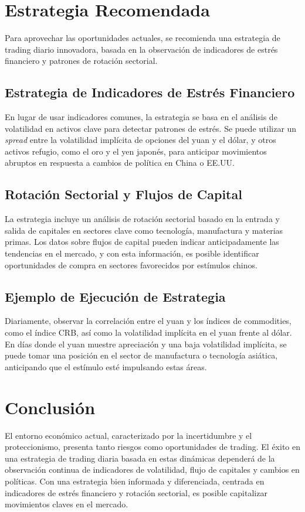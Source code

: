 \documentclass{article}
\begin{document}
\section{Estrategia Recomendada}
Para aprovechar las oportunidades actuales, se recomienda una estrategia de trading diario innovadora, basada en la observación de indicadores de estrés financiero y patrones de rotación sectorial.

\subsection{Estrategia de Indicadores de Estrés Financiero}
En lugar de usar indicadores comunes, la estrategia se basa en el análisis de volatilidad en activos clave para detectar patrones de estrés. Se puede utilizar un \textit{spread} entre la volatilidad implícita de opciones del yuan y el dólar, y otros activos refugio, como el oro y el yen japonés, para anticipar movimientos abruptos en respuesta a cambios de política en China o EE.UU.

\subsection{Rotación Sectorial y Flujos de Capital}
La estrategia incluye un análisis de rotación sectorial basado en la entrada y salida de capitales en sectores clave como tecnología, manufactura y materias primas. Los datos sobre flujos de capital pueden indicar anticipadamente las tendencias en el mercado, y con esta información, es posible identificar oportunidades de compra en sectores favorecidos por estímulos chinos.

\subsection{Ejemplo de Ejecución de Estrategia}
Diariamente, observar la correlación entre el yuan y los índices de commodities, como el índice CRB, así como la volatilidad implícita en el yuan frente al dólar. En días donde el yuan muestre apreciación y una baja volatilidad implícita, se puede tomar una posición en el sector de manufactura o tecnología asiática, anticipando que el estímulo esté impulsando estas áreas.

\section{Conclusión}
El entorno económico actual, caracterizado por la incertidumbre y el proteccionismo, presenta tanto riesgos como oportunidades de trading. El éxito en una estrategia de trading diaria basada en estas dinámicas dependerá de la observación continua de indicadores de volatilidad, flujo de capitales y cambios en políticas. Con una estrategia bien informada y diferenciada, centrada en indicadores de estrés financiero y rotación sectorial, es posible capitalizar movimientos claves en el mercado.
\end{document}

